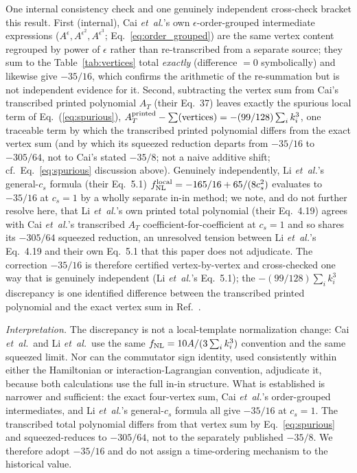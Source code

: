 \documentclass[aps,prd,twocolumn,superscriptaddress,showpacs,preprintnumbers,nofootinbib,longbibliography,floatfix]{revtex4-2}
\newcommand{\fnl}{f_{\rm NL}}
\newcommand{\etal}{\textit{et~al.}}
\begin{document}
One internal consistency check and one genuinely independent cross-check bracket this result. First (internal), Cai \etal's own $\epsilon$-order-grouped intermediate expressions ($A^{\epsilon},A^{\epsilon^2},A^{\epsilon^3}$; Eq.~\ref{eq:order_grouped}) are the same vertex content regrouped by power of $\epsilon$ rather than re-transcribed from a separate source; they sum to the Table~\ref{tab:vertices} total \emph{exactly} (difference $=0$ symbolically) and likewise give $-35/16$, which confirms the arithmetic of the re-summation but is not independent evidence for it. Second, subtracting the vertex sum from Cai's transcribed printed polynomial $A_T$ (their Eq.~37) leaves exactly the spurious local term of Eq.~(\ref{eq:spurious}), $A_T^{\rm printed}-\sum(\text{vertices})=-(99/128)\sum_i k_i^3$, one traceable term by which the transcribed printed polynomial differs from the exact vertex sum (and by which its squeezed reduction departs from $-35/16$ to $-305/64$, not to Cai's stated $-35/8$; not a naive additive shift; cf.\ Eq.~\ref{eq:spurious} discussion above). Genuinely independently, Li \etal's~\cite{LiQuintin:2017} general-$c_s$ formula (their Eq.~5.1) $\fnl^{\rm local}=-165/16+65/(8c_s^2)$ evaluates to $-35/16$ at $c_s=1$ by a wholly separate in-in method; we note, and do not further resolve here, that Li \etal's own printed total polynomial (their Eq.~4.19) agrees with Cai \etal's transcribed $A_T$ coefficient-for-coefficient at $c_s=1$ and so shares its $-305/64$ squeezed reduction, an unresolved tension between Li \etal's Eq.~4.19 and their own Eq.~5.1 that this paper does not adjudicate. The correction $-35/16$ is therefore certified vertex-by-vertex and cross-checked one way that is genuinely independent (Li \etal's Eq.~5.1); the $-(99/128)\sum_i k_i^3$ discrepancy is one identified difference between the transcribed printed polynomial and the exact vertex sum in Ref.~\cite{Cai:2009fn}.

\emph{Interpretation.} The discrepancy is not a local-template normalization change: Cai \etal\ and Li \etal\ use the same $\fnl=10A/(3\sum_i k_i^3)$ convention and the same squeezed limit. Nor can the commutator sign identity, used consistently within either the Hamiltonian or interaction-Lagrangian convention, adjudicate it, because both calculations use the full in-in structure. What is established is narrower and sufficient: the exact four-vertex sum, Cai \etal's order-grouped intermediates, and Li \etal's general-$c_s$ formula all give $-35/16$ at $c_s=1$. The transcribed total polynomial differs from that vertex sum by Eq.~\eqref{eq:spurious} and squeezed-reduces to $-305/64$, not to the separately published $-35/8$. We therefore adopt $-35/16$ and do not assign a time-ordering mechanism to the historical value.
\end{document}

